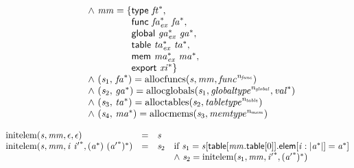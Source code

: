 $$\begin{array}{@{}lcl@{}l@{}}
 &&&\quad {\land}~{\mathit{mm}} = \{ \begin{array}[t]{@{}l@{}}
\mathsf{type}~{{\mathit{ft}}^\ast},\; \\
  \mathsf{func}~{{\mathit{fa}}_{{\mathit{ex}}}^\ast}~{{\mathit{fa}}^\ast},\; \\
  \mathsf{global}~{{\mathit{ga}}_{{\mathit{ex}}}^\ast}~{{\mathit{ga}}^\ast},\; \\
  \mathsf{table}~{{\mathit{ta}}_{{\mathit{ex}}}^\ast}~{{\mathit{ta}}^\ast},\; \\
  \mathsf{mem}~{{\mathit{ma}}_{{\mathit{ex}}}^\ast}~{{\mathit{ma}}^\ast},\; \\
  \mathsf{export}~{{\mathit{xi}}^\ast} \}\end{array} \\
 &&&\quad {\land}~({\mathit{s}}_{{1}},\, {{\mathit{fa}}^\ast}) = {\mathrm{allocfuncs}}({\mathit{s}}, {\mathit{mm}}, {{\mathit{func}}^{{\mathit{n}}_{{\mathit{func}}}}}) \\
 &&&\quad {\land}~({\mathit{s}}_{{2}},\, {{\mathit{ga}}^\ast}) = {\mathrm{allocglobals}}({\mathit{s}}_{{1}}, {{\mathit{globaltype}}^{{\mathit{n}}_{{\mathit{global}}}}}, {{\mathit{val}}^\ast}) \\
 &&&\quad {\land}~({\mathit{s}}_{{3}},\, {{\mathit{ta}}^\ast}) = {\mathrm{alloctables}}({\mathit{s}}_{{2}}, {{\mathit{tabletype}}^{{\mathit{n}}_{{\mathit{table}}}}}) \\
 &&&\quad {\land}~({\mathit{s}}_{{4}},\, {{\mathit{ma}}^\ast}) = {\mathrm{allocmems}}({\mathit{s}}_{{3}}, {{\mathit{memtype}}^{{\mathit{n}}_{{\mathit{mem}}}}}) \\
\end{array}
$$

\vspace{1ex}

$$
\begin{array}{@{}lcl@{}l@{}}
{\mathrm{initelem}}({\mathit{s}}, {\mathit{mm}}, \epsilon, \epsilon) &=& {\mathit{s}} &  \\
{\mathrm{initelem}}({\mathit{s}}, {\mathit{mm}}, {\mathit{i}}~{{\mathit{i}'}^\ast}, ({{\mathit{a}}^\ast})~{({{\mathit{a}'}^\ast})^\ast}) &=& {\mathit{s}}_{{2}} &\quad
  \mbox{if}~{\mathit{s}}_{{1}} = {\mathit{s}}[\mathsf{table}[{\mathit{mm}}.\mathsf{table}[0]].\mathsf{elem}[{\mathit{i}} : {|{{\mathit{a}}^\ast}|}] = {{\mathit{a}}^\ast}] \\
 &&&\quad {\land}~{\mathit{s}}_{{2}} = {\mathrm{initelem}}({\mathit{s}}_{{1}}, {\mathit{mm}}, {{\mathit{i}'}^\ast}, {({{\mathit{a}'}^\ast})^\ast}) \\
\end{array}
$$

